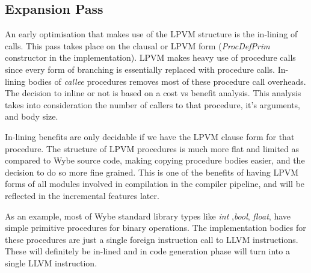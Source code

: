 \subsection{Expansion Pass}

An early optimisation that makes use of the LPVM structure is the in-lining of
calls. This pass takes place on the clausal or LPVM form (\textit{ProcDefPrim}
constructor in the implementation). LPVM makes heavy use of procedure calls
since every form of branching is essentially replaced with procedure
calls. In-lining bodies of \textit{callee} procedures removes most of these
procedure call overheads. The decision to inline or not is based on a cost vs
benefit analysis. This analysis takes into consideration the number of callers
to that procedure, it's arguments, and body size. 

In-lining benefits are only decidable if we have the LPVM clause form for that
procedure. The structure of LPVM procedures is much more flat and limited as
compared to Wybe source code, making copying procedure bodies easier, and the
decision to do so more fine grained. This is one of the benefits of having LPVM
forms of all modules involved in compilation in the compiler pipeline, and will
be reflected in the incremental features later.

As an example, most of Wybe standard library types like \textit{int}
,\textit{bool}, \textit{float}, have simple primitive procedures for binary
operations. The implementation bodies for these procedures are just a single
foreign instruction call to LLVM instructions. These will definitely be
in-lined and in code generation phase will turn into a single LLVM instruction.



